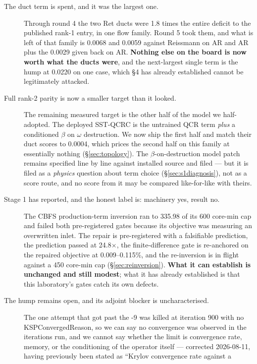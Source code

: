 \documentclass[11pt,a4paper]{article}
\newcommand{\breakus}{\textunderscore\allowbreak}
\newcommand{\code}[1]{{\small\ttfamily\let\_\breakus #1}}
\begin{document}
\begin{description}
\item[The duct term is spent, and it was the largest one.] Through round 4 the two
  \code{Ret\_360} ducts were 1.8 times the entire deficit to the published rank-1 entry, in
  one flow family. Round 5 took them, and what is left of that family is 0.0068 and 0.0059
  against Reissmann on \code{AR\_1} and \code{AR\_3} plus the 0.0029 given back on
  \code{AR\_14}. \textbf{Nothing else on the board is now worth what the ducts were}, and
  the next-largest single term is the hump at 0.0220 on one case, which \S4 has already
  established cannot be legitimately attacked.
\item[Full rank-2 parity is now a smaller target than it looked.] The remaining measured
  target is the other half of the model we half-adopted. The deployed SST-QCRC is the
  untrained QCR term \emph{plus} a conditioned
  $\beta$ on $\omega$ destruction. We now ship the first half and match their duct scores to
  0.0004, which prices the second half on this family at essentially nothing
  (\S\ref{sec:topology}). The $\beta$-on-destruction model patch remains specified line by
  line against installed source and filed --- but it is filed as a \emph{physics} question
  about term choice (\S\ref{sec:s1diagnosis}), not as a score route, and no score from it
  may be compared like-for-like with theirs.
\item[Stage 1 has reported, and the honest label is: machinery yes, result no.] The CBFS
  production-term inversion ran to 335.98 of its 600 core-min cap and failed both
  pre-registered gates because its objective was measuring an overwritten inlet. The repair
  is pre-registered with a falsifiable prediction, the prediction passed at 24.8$\times$,
  the finite-difference gate is re-anchored on the repaired objective at 0.009--0.115\%,
  and the re-inversion is in flight against a 450 core-min cap
  (\S\ref{sec:reinversion}). \textbf{What it can establish is unchanged and still modest};
  what it has already established is that this laboratory's gates catch its own defects.
\item[The hump remains open, and its adjoint blocker is uncharacterised.] The one attempt
  that got past the \code{-9} was killed at iteration 900 with no \code{KSPConvergedReason},
  so we can say no convergence was observed in the iterations run, and we cannot say whether
  the limit is convergence rate, memory, or the conditioning of the operator itself ---
  corrected 2026-08-11, having previously been stated as ``Krylov convergence rate against a

\end{description}
\end{document}
